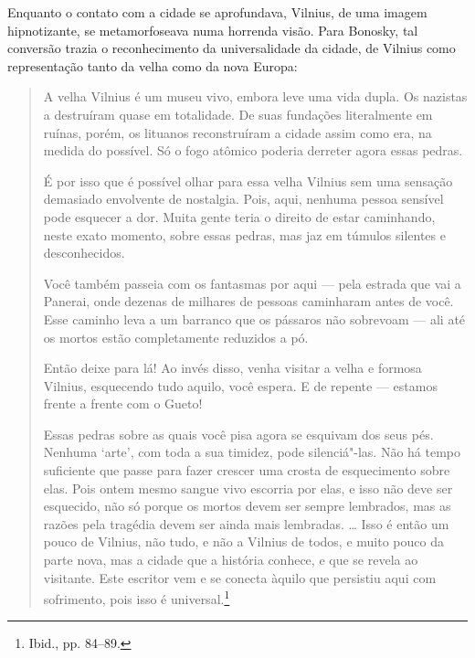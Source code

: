 Enquanto o contato com a cidade se aprofundava, Vilnius, de uma imagem
hipnotizante, se metamorfoseava numa horrenda visão. Para Bonosky, tal
conversão trazia o reconhecimento da universalidade da cidade, de
Vilnius como representação tanto da velha como da nova Europa:

\begin{quote}
A velha Vilnius é um museu vivo, embora leve uma vida dupla. Os nazistas
a destruíram quase em totalidade. De suas fundações literalmente em
ruínas, porém, os lituanos reconstruíram a cidade assim como era, na
medida do possível. Só o fogo atômico poderia derreter agora essas
pedras.

É por isso que é possível olhar para essa velha Vilnius sem uma sensação
demasiado envolvente de nostalgia. Pois, aqui, nenhuma pessoa sensível
pode esquecer a dor. Muita gente teria o direito de estar caminhando,
neste exato momento, sobre essas pedras, mas jaz em túmulos silentes e
desconhecidos.

Você também passeia com os fantasmas por aqui --- pela estrada que vai a
Panerai, onde dezenas de milhares de pessoas caminharam antes de você.
Esse caminho leva a um barranco que os pássaros não sobrevoam --- ali até
os mortos estão completamente reduzidos a pó.

Então deixe para lá! Ao invés disso, venha visitar a velha e formosa
Vilnius, esquecendo tudo aquilo, você espera. E de repente --- estamos
frente a frente com o Gueto!

Essas pedras sobre as quais você pisa agora se esquivam dos seus pés.
Nenhuma `arte', com toda a sua timidez, pode silenciá"-las. Não há tempo
suficiente que passe para fazer crescer uma crosta de esquecimento sobre
elas. Pois ontem mesmo sangue vivo escorria por elas, e isso não deve
ser esquecido, não só porque os mortos devem ser sempre lembrados, mas
as razões pela tragédia devem ser ainda mais lembradas. \ldots{} Isso é
então um pouco de Vilnius, não tudo, e não a Vilnius de todos, e muito
pouco da parte nova, mas a cidade que a história conhece, e que se
revela ao visitante. Este escritor vem e se conecta àquilo que persistiu
aqui com sofrimento, pois isso é universal.\footnote{Ibid., pp. 84--89.}
\end{quote}

